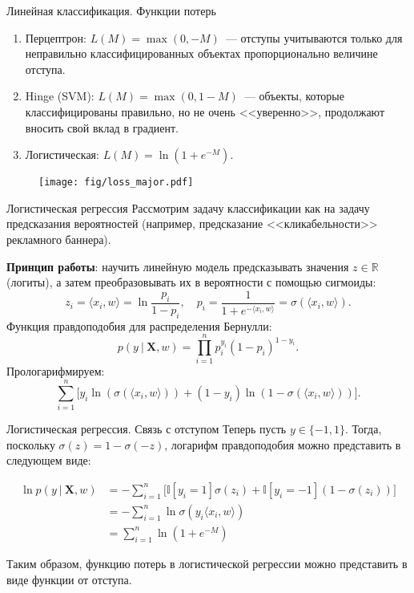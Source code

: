 \documentclass[notheorems, handout]{beamer}
\begin{document}
\begin{frame}{Линейная классификация. Функции потерь}
	\begin{enumerate}
		\item Перцептрон: $L(M) = \max(0, -M)$~--- отступы учитываются только для неправильно классифицированных объектах пропорционально величине отступа.
		\item Hinge (SVM): $L(M) = \max(0, 1-M)$~--- объекты, которые классифицированы правильно, но не очень <<уверенно>>, продолжают вносить свой вклад в градиент.
		\item Логистическая: $L(M) = \ln\left(1+e^{-M}\right)$.
	\end{enumerate}
	\begin{figure}
		\texttt{[image: fig/loss\_major.pdf]}
	\end{figure}
\end{frame}

\begin{frame}{Логистическая регрессия}
	Рассмотрим задачу классификации как на задачу предсказания вероятностей (например, предсказание <<кликабельности>> рекламного баннера).

	\textbf{Принцип работы}: научить линейную модель предсказывать значения $z\in\mathbb{R}$ (логиты), а затем преобразовывать их в вероятности с помощью сигмоиды:
	\[
		z_i=\langle x_i, w\rangle = \ln\frac{p_i}{1 - p_i},\quad p_i = \frac{1}{1+e^{-\langle x_i, w\rangle}}=\sigma(\langle x_i, w\rangle).
	\]
	Функция правдоподобия для распределения Бернулли:
	\[
		p(y~|~\mathbf{X}, w)=\prod_{i=1}^np_i^{y_i}(1-p_i)^{1-y_i}.
	\]
	Прологарифмируем:
	\[
		\sum_{i=1}^n\Big[y_i\ln(\sigma(\langle x_i, w\rangle)) + (1-y_i)\ln(1-\sigma(\langle x_i, w\rangle))\Big].
	\]
\end{frame}

\begin{frame}{Логистическая регрессия. Связь с отступом}
	Теперь пусть $y\in\{-1, 1\}$. Тогда, поскольку $\sigma(z)=1-\sigma(-z)$, логарифм правдоподобия можно представить в следующем виде:

	\begin{align*}
		\ln p (y~|~ \mathbf{X}, w) & = -\sum_{i=1}^n\Big[\mathbb{I}[y_i=1]\sigma(z_i)+\mathbb{I}[y_i=-1]\left(1-\sigma(z_i)\right)\Big] \\
		                           & = -\sum_{i=1}^n \ln\sigma(y_i\langle x_i, w\rangle)                                                \\
		                           & = \sum_{i=1}^n \ln\left(1 + e^{-M}\right)
	\end{align*}

	Таким образом, функцию потерь в логистической регрессии можно представить в виде функции от отступа.
\end{frame}
\end{document}
